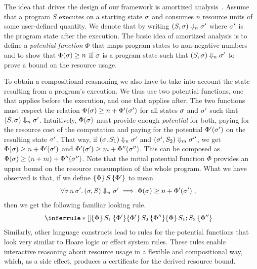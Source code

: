\documentclass[nocopyrightspace,preprint]{sigplanconf}
\begin{document}
The idea that drives the design of our framework is amortized
analysis~\cite{Tarjan-amort}.  Assume that a program $S$ executes on a
starting state $\sigma$ and consumes $n$ resource units of some
user-defined quantity.  We denote that by writing $(S, \sigma)
\Downarrow_n \sigma'$ where $\sigma'$ is the program state after the
execution.  The basic idea of amortized analysis is to define a
\emph{potential function} $\Phi$ that maps program states to non-negative
numbers and to show that $\Phi(\sigma) \geq n$ if $\sigma$ is a
program state such that $(S, \sigma) \Downarrow_n \sigma'$ to prove
a bound on the resource usage.

To obtain a compositional reasnoning we also have to take into account
the state resulting from a program's execution.  We thus use two
potential functions, one that applies before the execution, and one
that applies after.  The two functions must respect the relation
$\Phi(\sigma) \ge n + \Phi'(\sigma')$ for all states $\sigma$ and
$\sigma'$ such that $(S, \sigma) \Downarrow_n \sigma'$.  Intuitively,
$\Phi(\sigma)$ must provide enough \emph{potential} for both, paying
for the resource cost of the computation and paying for the potential
$\Phi'(\sigma')$ on the resulting state $\sigma'$. That way, if
$(\sigma, S_1) \Downarrow_n \sigma'$ and $(\sigma', S_2) \Downarrow_m
\sigma''$, we get $\Phi(\sigma) \ge n + \Phi'(\sigma')$ and
$\Phi'(\sigma') \ge m + \Phi''(\sigma'')$.  This can be composed as
$\Phi(\sigma) \ge (n + m) + \Phi''(\sigma'')$.  Note that the initial
potential function $\Phi$ provides an upper bound on the resource
consumption of the whole program.  What we have observed is that, if
we define $\{\Phi\}\, S\, \{\Phi'\}$ to mean
$$
\forall \sigma\, n\, \sigma'.\, (\sigma, S) \Downarrow_n \sigma' \implies \Phi(\sigma) \ge
n + \Phi'(\sigma') \; ,
$$
then we get the following familiar looking rule.
$$
\RuleNolabel
{\htriple{\Phi}{S_1}{\Phi'} \\ \htriple{\Phi'}{S_2}{\Phi''}}
{\htriple{\Phi} {S_1; S_2}  {\Phi''}}
$$
%
Similarly, other language constructs lead to rules for the potential
functions that look very similar to Hoare logic or effect system
rules.  These rules enable interactive reasoning about resource usage
in a flexible and compositional way, which, as a side effect, produces
a certificate for the derived resource bound.

\end{document}
